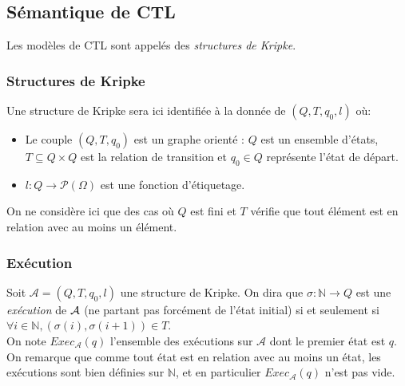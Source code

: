 \documentclass[10pt,a4paper]{article}
\begin{document}
\subsection{Sémantique de CTL}
Les modèles de CTL sont appelés des \emph{structures de Kripke}.

\subsubsection{Structures de Kripke}
Une structure de Kripke sera ici identifiée à la donnée de $(Q,T,q_0,l)$ où:
\begin{itemize}
\item Le couple $(Q,T, q_0)$ est un graphe orienté : $Q$ est un ensemble d'états, $T \subseteq Q \times Q$ est la relation de transition et $q_0 \in Q$ représente l'état de départ.
\item $l : Q \to \mathcal{P}(\Omega)$ est une fonction d'étiquetage.
\end{itemize}
\bigskip
On ne considère ici que des cas où $Q$ est fini et $T$ vérifie que tout élément est en relation avec au moins un élément.

\subsubsection{Exécution}
Soit $\mathcal{A} = (Q,T,q_0,l)$ une structure de Kripke.
On dira que $\sigma : \mathbb{N} \to Q$ est une \emph{exécution} de $\cal{A}$ (ne partant pas forcément de l'état initial) si et seulement si $\forall i \in \mathbb{N}, (\sigma (i), \sigma (i+1)) \in T$.
\\
On note $Exec_\mathcal{A}(q)$ l'ensemble des exécutions sur $\mathcal{A}$ dont le premier état est $q$.\\

On remarque que comme tout état est en relation avec au moins un état, les exécutions sont bien définies sur $\mathbb{N}$, et en particulier $Exec_\mathcal{A}(q)$ n'est pas vide.
\end{document}
